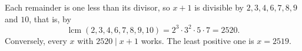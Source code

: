 Each remainder is one less than its divisor, so $x+1$ is divisible by $2,3,4,6,7,8,9$ and $10$, that is, by
\[\operatorname{lcm}(2,3,4,6,7,8,9,10)=2^3\cdot3^2\cdot5\cdot7=2520.\]
Conversely, every $x$ with $2520\mid x+1$ works. The least positive one is $x=\boxed{2519}$.
